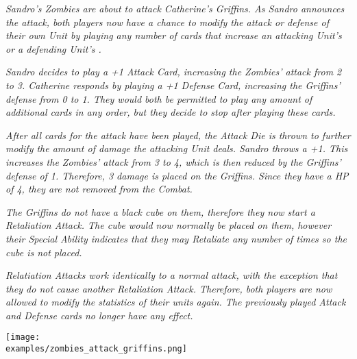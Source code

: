 \begin{multicols}{2}
\textit{Sandro's Zombies are about to attack Catherine's Griffins.
As Sandro announces the attack, both players now have a chance to modify the attack or defense of their own Unit by playing any number of  cards that increase an attacking Unit's  or a defending Unit's .}\par
\textit{Sandro decides to play a +1 Attack Card, increasing the Zombies' attack from 2 to 3.
Catherine responds by playing a +1 Defense Card, increasing the Griffins' defense from 0 to 1.
They would both be permitted to play any amount of additional cards in any order, but they decide to stop after playing these cards.}\par
\textit{After all cards for the attack have been played, the Attack Die is thrown to further modify the amount of damage the attacking Unit deals.
Sandro throws a +1.
This increases the Zombies' attack from 3 to 4, which is then reduced by the Griffins' defense of 1. Therefore, 3 damage  is placed on the Griffins. Since they have a HP  of 4, they are not removed from the Combat.}\par
\textit{The Griffins do not have a black cube on them, therefore they now start a Retaliation Attack.
The cube would now normally be placed on them, however their Special  Ability indicates that they may Retaliate any number of times so the cube is not placed.}\par
\textit{Relatiation Attacks work identically to a normal attack, with the exception that they do not cause another Retaliation Attack.
Therefore, both players are now allowed to modify the statistics of their units again.
The previously played Attack and Defense cards no longer have any effect.}

\end{multicols}

  \begin{minipage}{0.8\textwidth}
    \centering
    \texttt{[image: \\examples/zombies\_attack\_griffins.png]}
\end{minipage}
